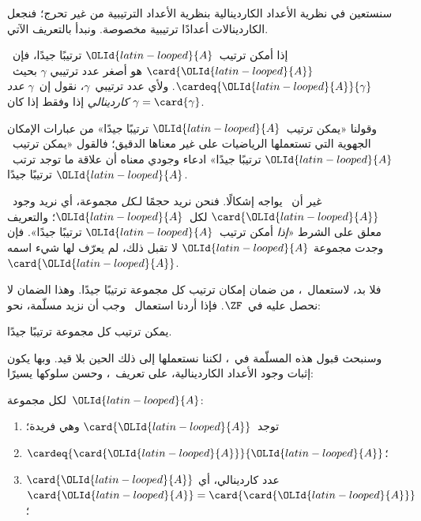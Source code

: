 \documentclass[../../../include/open-logic-section]{subfiles}
\begin{document}

سنستعين في نظرية الأعداد الكاردينالية بنظرية الأعداد الترتيبية من غير
تحرج؛ فنجعل الكاردينالات أعدادًا ترتيبية مخصوصة. ونبدأ بالتعريف الآتي.

\begin{defn}
إذا أمكن ترتيب~$\OLId{latin-looped}{A}$ ترتيبًا جيدًا، فإن~$\card{\OLId{latin-looped}{A}}$ هو أصغر عدد ترتيبي
$\gamma$ بحيث~$\cardeq{\OLId{latin-looped}{A}}{\gamma}$. ولأي عدد ترتيبي~$\gamma$، نقول
إن~$\gamma$ \emph{عدد كاردينالي} إذا وفقط إذا كان
$\gamma = \card{\gamma}$.
\end{defn}

وقولنا «يمكن ترتيب~$\OLId{latin-looped}{A}$ ترتيبًا جيدًا» من عبارات الإمكان الجهوية التي
تستعملها الرياضيات على غير معناها الدقيق؛ فالقول «يمكن ترتيب~$\OLId{latin-looped}{A}$
ترتيبًا جيدًا» ادعاء وجودي معناه أن علاقة ما توجد ترتب~$\OLId{latin-looped}{A}$ ترتيبًا
جيدًا.

غير أن~ يواجه إشكالًا. فنحن نريد حجمًا
لـ\emph{كل} مجموعة، أي نريد وجود~$\card{\OLId{latin-looped}{A}}$ لكل~$\OLId{latin-looped}{A}$؛ والتعريف معلق
على الشرط «\emph{إذا} أمكن ترتيب~$\OLId{latin-looped}{A}$ ترتيبًا جيدًا». فإن وجدت مجموعة
$\OLId{latin-looped}{A}$ لا تقبل ذلك، لم يعرّف لها شيء اسمه~$\card{\OLId{latin-looped}{A}}$.

فلا بد، لاستعمال~، من ضمان إمكان ترتيب كل
مجموعة ترتيبًا جيدًا. وهذا الضمان لا نحصل عليه في~$\ZF$. فإذا أردنا
استعمال~ وجب أن نزيد مسلّمة، نحو:
\begin{axiom}
يمكن ترتيب كل مجموعة ترتيبًا جيدًا.
\end{axiom}
وسنبحث قبول هذه المسلّمة في~، لكننا نستعملها
إلى ذلك الحين بلا قيد. وبها يكون إثبات وجود الأعداد الكاردينالية، على
تعريف~، وحسن سلوكها يسيرًا:

\begin{lem}
لكل مجموعة~$\OLId{latin-looped}{A}$:
\begin{enumerate}
	\item{} توجد~$\card{\OLId{latin-looped}{A}}$ وهي فريدة؛
	\item{} $\cardeq{\card{\OLId{latin-looped}{A}}}{\OLId{latin-looped}{A}}$؛
	\item{} $\card{\OLId{latin-looped}{A}}$ عدد كاردينالي، أي
	$\card{\OLId{latin-looped}{A}} = \card{\card{\OLId{latin-looped}{A}}}$؛
\end{enumerate}
\end{lem}
\end{document}
